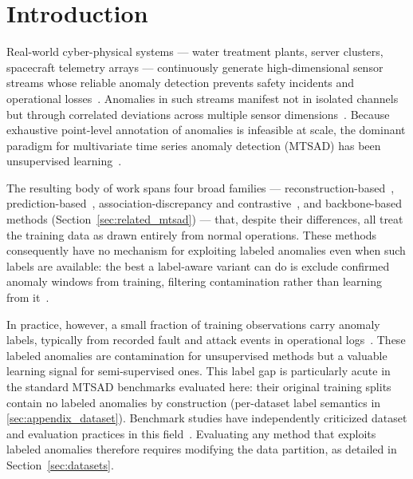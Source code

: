 
\section{Introduction}
\label{sec:intro}

Real-world cyber-physical systems --- water treatment plants, server clusters, spacecraft telemetry arrays --- continuously generate high-dimensional sensor streams whose reliable anomaly detection prevents safety incidents and operational losses~\cite{schmidl2022evaluation,blazquez2021review}.
Anomalies in such streams manifest not in isolated channels but through correlated deviations across multiple sensor dimensions~\cite{deng2021gdn,wu2025catch}.
Because exhaustive point-level annotation of anomalies is infeasible at scale, the dominant paradigm for multivariate time series anomaly detection (MTSAD) has been unsupervised learning~\cite{wang2025nrdetector}.

The resulting body of work spans four broad families --- reconstruction-based~\cite{zong2018dagmm,su2019omnianomaly,audibert2020usad,song2023memto,wu2025catch}, prediction-based~\cite{deng2021gdn}, association-discrepancy and contrastive~\cite{xu2022anomalytransformer,yang2023dcdetector}, and backbone-based~\cite{tuli2022tranad,wu2023timesnet} methods (Section~\ref{sec:related_mtsad}) --- that, despite their differences, all treat the training data as drawn entirely from normal operations.
These methods consequently have no mechanism for exploiting labeled anomalies even when such labels are available: the best a label-aware variant can do is exclude confirmed anomaly windows from training, filtering contamination rather than learning from it~\cite{wang2025nrdetector}.

In practice, however, a small fraction of training observations carry anomaly labels, typically from recorded fault and attack events in operational logs~\cite{wang2025nrdetector}.
These labeled anomalies are contamination for unsupervised methods but a valuable learning signal for semi-supervised ones.
This label gap is particularly acute in the standard MTSAD benchmarks evaluated here: their original training splits contain no labeled anomalies by construction (per-dataset label semantics in \ref{sec:appendix_dataset}).
Benchmark studies have independently criticized dataset and evaluation practices in this field~\cite{liu2024elephant,schmidl2022evaluation}.
Evaluating any method that exploits labeled anomalies therefore requires modifying the data partition, as detailed in Section~\ref{sec:datasets}.

